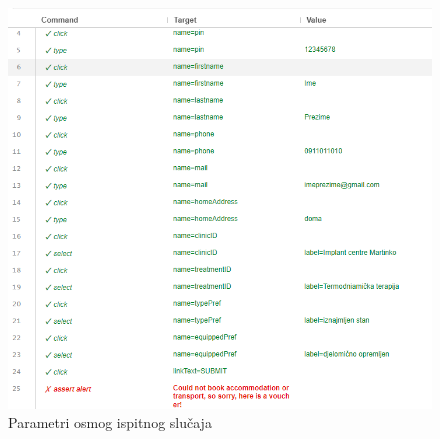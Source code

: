 			\begin{figure}[H]
				\centering
				\includegraphics[width=\textwidth]{"slike/Selenium/pacijent testovi/registerPatientAgain_parameters.png"}
				\caption{Parametri osmog ispitnog slučaja}
				\label{fig: registerPatientAgain_parameters}
			\end{figure}
